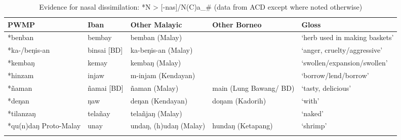\documentclass[output=paper]{langscibook}
\begin{document}
\begin{table}[t]
\begin{tabularx}{\textwidth}{QlQQQ}
\lsptoprule
 {{PWMP}} & {{Iban}} & {{Other Malayic}} & {{Other Borneo}} & {{Gloss}}\\
\midrule
*benban & bembay & bemban (Malay) &  & ‘herb used in making baskets’\\
\tablevspace
*ka-/beŋis-an & binsai [BD] & ka-beŋis-an (Malay) &  & ‘anger, cruelty/aggressive’\\
\tablevspace
*kembaŋ & kemay & kembaŋ  (Malay) &  & ‘swollen/expansion/swollen’\\
\tablevspace
*hinzam & injaw & m-injam (Kendayan) &  & ‘borrow/lend/borrow’\\
\tablevspace
*ñaman & ñamai [BD] & ñaman (Malay) & main (Lung Bawang/ BD) & ‘tasty, delicious’\\
\tablevspace
*deŋan & ŋaw & deŋan (Kendayan) & doŋam (Kadorih) & ‘with’\\
\tablevspace
*tilanzaŋ & telañay & telañjaŋ (Malay) &  & ‘naked’\\
\tablevspace
*qu(n)daŋ Proto-Malay & unay & undaŋ, (h)udaŋ (Malay) & hundaŋ (Ketapang) & ‘shrimp’\\
\lspbottomrule
\end{tabularx}
\caption{\label{tab:blevins:10}  Evidence for nasal dissimilation: *N > [-nas]/N(C)a\_\# (data from ACD except where noted otherwise)}
\end{table}
\end{document}
